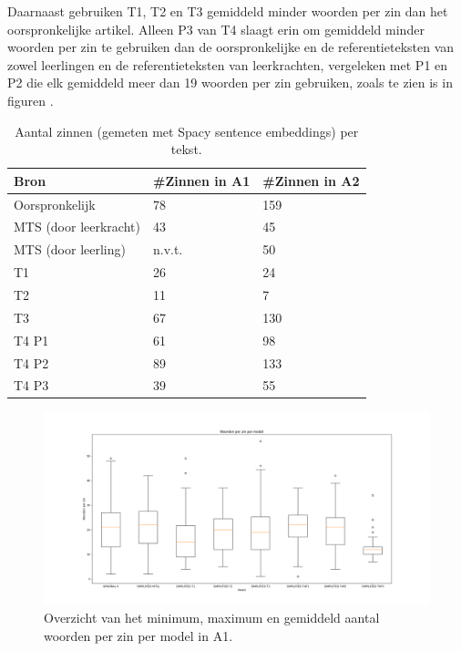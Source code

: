 Daarnaast gebruiken T1, T2 en T3 gemiddeld minder woorden per zin dan het oorspronkelijke artikel. Alleen P3 van T4 slaagt erin om gemiddeld minder woorden per zin te gebruiken dan de oorspronkelijke en de referentieteksten van zowel leerlingen en de referentieteksten van leerkrachten, vergeleken met P1 en P2 die elk gemiddeld meer dan 19 woorden per zin gebruiken, zoals te zien is in figuren . 

\begin{table}[h]
	\centering
	\begin{tabular}{ | m{3cm} | m{3cm} | m{3cm} | } 
		\hline
		\textbf{Bron} & \textbf{#Zinnen in A1} & \textbf{#Zinnen in A2} \\
		\hline
		Oorspronkelijk & 78  & 159 \\ 
		\hline
		MTS (door leerkracht) & 43 & 45 \\
		\hline
		MTS (door leerling) & n.v.t. & 50 \\
		\hline
		T1 & 26 & 24 \\
		\hline
		T2 & 11 & 7 \\
		\hline
		T3 & 67 & 130 \\
		\hline
		T4 P1 & 61 & 98 \\
		\hline
		T4 P2 & 89 & 133 \\
		\hline
		T4 P3 & 39 & 55 \\
		\hline
	\end{tabular}
	\caption{Aantal zinnen (gemeten met Spacy sentence embeddings) per tekst.}
	\label{table:resultaten-aantal-zinnen}
\end{table}

\begin{figure}
	\includegraphics[width=\linewidth]{img/boxplot-avg-a1.png}
	\caption{Overzicht van het minimum, maximum en gemiddeld aantal woorden per zin per model in A1.}
	\label{img:boxplot-min-max-avg-words-a1}
\end{figure}

